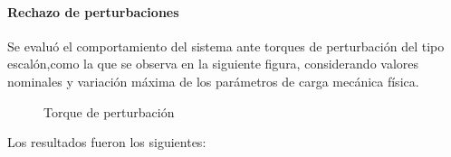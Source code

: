 \documentclass[a4paper, 10pt, onecolumn,journal]{ieeeconf}
\begin{document}
\paragraph{\textbf{Rechazo de perturbaciones}} 
Se evaluó el comportamiento del sistema ante torques de perturbación del tipo escalón,como la que se observa en la siguiente figura, considerando valores nominales y variación máxima de los parámetros de carga mecánica física.
\begin{figure}[H]
	\centering
	\begin{adjustbox}{max width=\columnwidth}
	\end{adjustbox}
	\caption{Torque de perturbación}
	\label{Torque de perturbación}
\end{figure}
Los resultados fueron los siguientes:
\end{document}
